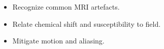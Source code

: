 \begin{objectives}
\begin{itemize}[leftmargin=1.4em,itemsep=2pt]
\item Recognize common MRI artefacts.
\item Relate chemical shift and susceptibility to field.
\item Mitigate motion and aliasing.
\end{itemize}
\end{objectives}
